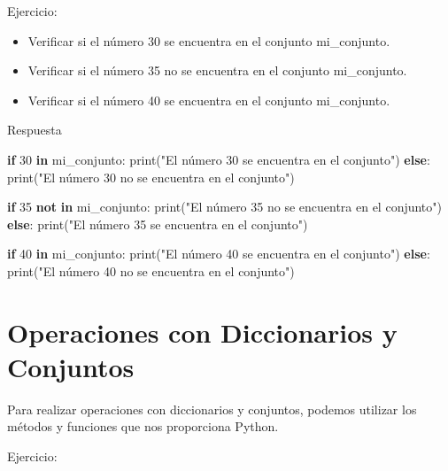 \documentclass[
  a4paper,
  DIV=11,
  numbers=noendperiod,
  onepage,
  openany]{scrreprt}
\newenvironment{Shaded}{\begin{snugshade}}{\end{snugshade}}
\newcommand{\BuiltInTok}[1]{\textcolor[rgb]{0.00,0.23,0.31}{#1}}
\newcommand{\ControlFlowTok}[1]{\textcolor[rgb]{0.00,0.23,0.31}{\textbf{#1}}}
\newcommand{\DecValTok}[1]{\textcolor[rgb]{0.68,0.00,0.00}{#1}}
\newcommand{\KeywordTok}[1]{\textcolor[rgb]{0.00,0.23,0.31}{\textbf{#1}}}
\newcommand{\NormalTok}[1]{\textcolor[rgb]{0.00,0.23,0.31}{#1}}
\newcommand{\StringTok}[1]{\textcolor[rgb]{0.13,0.47,0.30}{#1}}
\providecommand{\tightlist}{%
  \setlength{\itemsep}{0pt}\setlength{\parskip}{0pt}}\usepackage{longtable,booktabs,array}
\begin{document}
Ejercicio:

\begin{itemize}
\tightlist
\item
  Verificar si el número 30 se encuentra en el conjunto mi\_conjunto.
\item
  Verificar si el número 35 no se encuentra en el conjunto mi\_conjunto.
\item
  Verificar si el número 40 se encuentra en el conjunto mi\_conjunto.
\end{itemize}

Respuesta

\begin{Shaded}
\begin{Highlighting}[]
\ControlFlowTok{if} \DecValTok{30} \KeywordTok{in}\NormalTok{ mi\_conjunto:}
    \BuiltInTok{print}\NormalTok{(}\StringTok{"El número 30 se encuentra en el conjunto"}\NormalTok{)}
\ControlFlowTok{else}\NormalTok{:}
    \BuiltInTok{print}\NormalTok{(}\StringTok{"El número 30 no se encuentra en el conjunto"}\NormalTok{)}

\ControlFlowTok{if} \DecValTok{35} \KeywordTok{not} \KeywordTok{in}\NormalTok{ mi\_conjunto:}
    \BuiltInTok{print}\NormalTok{(}\StringTok{"El número 35 no se encuentra en el conjunto"}\NormalTok{)}
\ControlFlowTok{else}\NormalTok{:}
    \BuiltInTok{print}\NormalTok{(}\StringTok{"El número 35 se encuentra en el conjunto"}\NormalTok{)}

\ControlFlowTok{if} \DecValTok{40} \KeywordTok{in}\NormalTok{ mi\_conjunto:}
    \BuiltInTok{print}\NormalTok{(}\StringTok{"El número 40 se encuentra en el conjunto"}\NormalTok{)}
\ControlFlowTok{else}\NormalTok{:}
    \BuiltInTok{print}\NormalTok{(}\StringTok{"El número 40 no se encuentra en el conjunto"}\NormalTok{)}
\end{Highlighting}
\end{Shaded}

\chapter{Operaciones con Diccionarios y
Conjuntos}\label{operaciones-con-diccionarios-y-conjuntos}

Para realizar operaciones con diccionarios y conjuntos, podemos utilizar
los métodos y funciones que nos proporciona Python.

Ejercicio:
\end{document}
